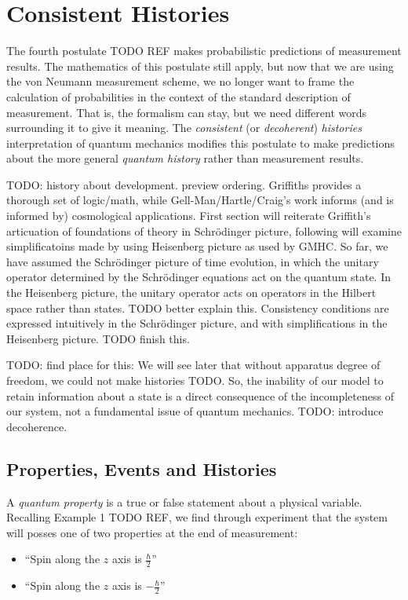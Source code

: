 \usetikzlibrary{shapes.geometric}
\usetikzlibrary{positioning}

\chapter{Consistent Histories}

The fourth postulate TODO REF makes probabilistic predictions of measurement results. The mathematics of this postulate still apply, but now that we are using the von Neumann measurement scheme, we no longer want to frame the calculation of probabilities in the context of the standard description of measurement. That is, the formalism can stay, but we need different words surrounding it to give it meaning. The \textit{consistent} (or \textit{decoherent}) \textit{histories} interpretation of quantum mechanics modifies this postulate to make predictions about the more general \textit{quantum history} rather than measurement results.

TODO: history about development. preview ordering. Griffiths provides a thorough set of logic/math, while Gell-Man/Hartle/Craig's work informs (and is informed by) cosmological applications. First section will reiterate Griffith's articuation of foundations of theory in Schrödinger picture, following will examine simplificatoins made by using Heisenberg picture as used by GMHC. So far, we have assumed the Schrödinger picture of time evolution, in which the unitary operator determined by the Schrödinger equations act on the quantum state. In the Heisenberg picture, the unitary operator acts on operators in the Hilbert space rather than states. TODO better explain this.
Consistency conditions are expressed intuitively in the Schrödinger picture, and with simplifications in the Heisenberg picture. TODO finish this.

TODO: find place for this: We will see later that without apparatus degree of freedom, we could not make histories TODO. So, the inability of our model to retain information about a state is a direct consequence of the incompleteness of our system, not a fundamental issue of quantum mechanics. TODO: introduce decoherence.

\section{Properties, Events and Histories}

A \textit{quantum property} is a true or false statement about a physical variable. Recalling Example 1 TODO REF, we find through experiment that the system will posses one of two properties at the end of measurement:
\begin{itemize}
  \item ``Spin along the $z$ axis is $\frac{\hbar}{2}$''
  \item ``Spin along the $z$ axis is $-\frac{\hbar}{2}$''
\end{itemize}

